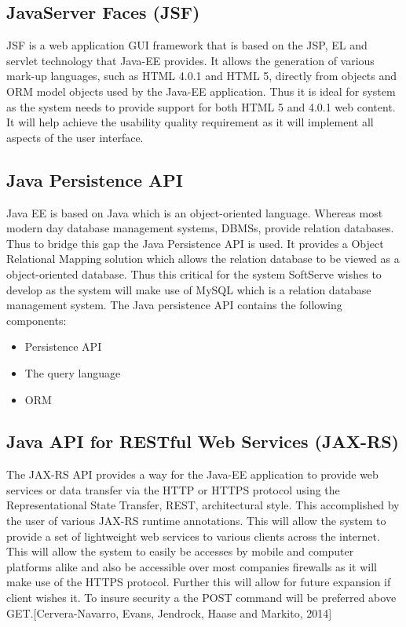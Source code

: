 \documentclass[12pt]{article}
\begin{document}
\subsection{JavaServer Faces (JSF)}
JSF is a web application GUI framework that is based on the JSP, EL and servlet technology that Java-EE provides. It allows the generation of various mark-up languages, such as HTML 4.0.1 and HTML 5, directly from objects and ORM model objects used by the Java-EE application. Thus it is ideal for system as the system needs to provide support for both HTML 5 and 4.0.1 web content.\\

It will help achieve the usability quality requirement as it will implement all aspects of the user interface.

\subsection{Java Persistence API}
Java EE is based on Java which is an object-oriented language. Whereas most modern day database management systems, DBMSs, provide relation databases. Thus to bridge this gap the Java Persistence API is used. It provides a Object Relational Mapping solution which allows the relation database to be viewed as a object-oriented database. Thus this critical for the system SoftServe wishes to develop as the system will make use of MySQL which is a relation database management system. The Java persistence API contains the following components:  
\begin{itemize}
\item Persistence API
\item The query language
\item ORM
\end{itemize}

\subsection{Java API for RESTful Web Services (JAX-RS)}
The JAX-RS API provides a way for the Java-EE application to provide web services or data transfer via the HTTP or HTTPS protocol using the Representational State Transfer, REST, architectural style. This accomplished by the user of various JAX-RS runtime annotations. This will allow the system to provide a set of lightweight web services to various clients across the internet. This will allow the system to easily be accesses by mobile and computer platforms alike and also be accessible over most companies firewalls as it will make use of the HTTPS protocol. Further this will allow for future expansion if client wishes it. To insure security a the POST command will be preferred above GET.[Cervera-Navarro, Evans, Jendrock, Haase and Markito, 2014]
\end{document}
